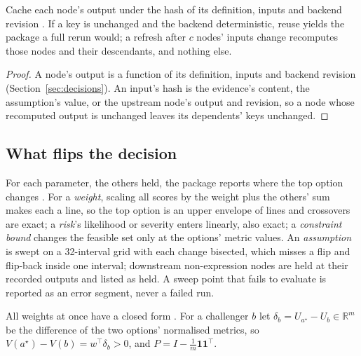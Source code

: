 \begin{proposition}
\label{prop:refresh}
Cache each node's output under the hash of its definition, inputs and backend
revision \shipped. If a key is unchanged and the backend deterministic, reuse yields the
package a full rerun would; a refresh after $c$ nodes' inputs change recomputes
those nodes and their descendants, and nothing else.
\end{proposition}
\begin{proof}
A node's output is a function of its definition, inputs and backend revision
(Section~\ref{sec:decisions}). An input's hash is the evidence's content, the
assumption's value, or the upstream node's output and revision, so a node whose
recomputed output is unchanged leaves its dependents' keys unchanged.
\end{proof}

\subsection{What flips the decision}
\label{sec:flip}

For each parameter, the others held, the package reports where the top option
changes \shipped. For a \emph{weight}, scaling all scores by the weight plus
the others' sum makes each a line, so the top option is an upper envelope of
lines and crossovers are exact; a \emph{risk}'s likelihood or severity enters
linearly, also exact; a \emph{constraint bound} changes the feasible set only
at the options' metric values. An \emph{assumption} is swept on a 32-interval
grid with each change bisected, which misses a flip and flip-back inside one
interval; downstream non-expression nodes are held at their recorded outputs
and listed as held. A sweep point that fails to evaluate is reported as an
error segment, never a failed run.

All weights at once have a closed form \proposed. For a challenger $b$ let
$\delta_b = U_{a^\star} - U_b \in \mathbb{R}^m$ be the difference of the two
options' normalised metrics, so $V(a^\star) - V(b) = w^{\top}\delta_b > 0$, and
$P = I - \tfrac{1}{m}\mathbf{1}\mathbf{1}^{\top}$.

